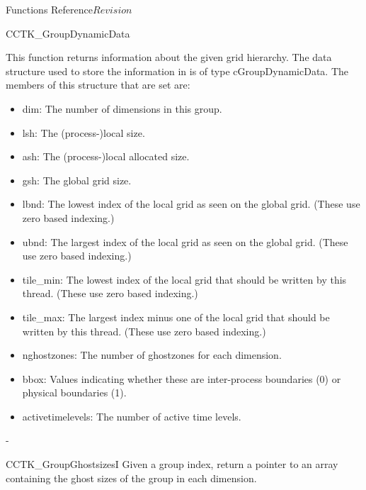 \begin{cactuspart}{ Functions Reference}{}{$Revision$}
\begin{FunctionDescription}{CCTK\_GroupDynamicData}{}
\begin{Discussion}
This function returns information about the given grid hierarchy.
The data structure used to store the information in is of type cGroupDynamicData.
The members of this structure that are set are:
\begin{itemize}
\item{dim:} The number of dimensions in this group.
\item{lsh:} The (process-)local size.
\item{ash:} The (process-)local allocated size.
\item{gsh:} The global grid size.
\item{lbnd:} The lowest index of the local grid as seen on the global
  grid. (These use zero based indexing.)
\item{ubnd:} The largest index of the local grid as seen on the global
  grid. (These use zero based indexing.)
\item{tile\_min:} The lowest index of the local grid that should be
  written by this thread. (These use zero based indexing.)
\item{tile\_max:} The largest index minus one of the local grid that
  should be written by this thread. (These use zero based indexing.)
\item{nghostzones:} The number of ghostzones for each dimension.
\item{bbox:} Values indicating whether these are inter-process
  boundaries (0) or physical boundaries (1).
\item{activetimelevels:} The number of active time levels.
\end{itemize}-
\end{Discussion}

\end{FunctionDescription}

\begin{FunctionDescription}{CCTK\_GroupGhostsizesI}
\label{CCTK-GroupGhostsizesI}
Given a group index, return a pointer to an array containing the ghost sizes of the group in each dimension.
 

\end{FunctionDescription}
\end{cactuspart}
